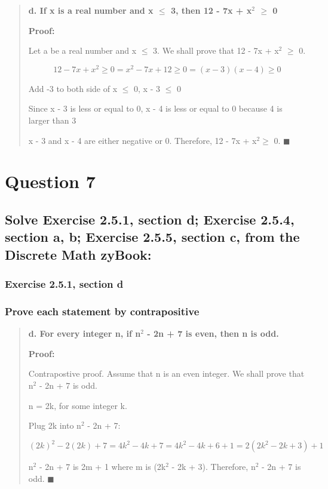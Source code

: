 \documentclass[11pt, oneside]{article}
\begin{document}
\begin{quote}
    \textbf{d. If x is a real number and x $\leq$ 3, then 12 - 7x + x$^2$ $\geq$ 0}
    
    \textbf{Proof:}
    
    Let a be a real number and x $\leq$ 3. We shall prove that 12 - 7x + x$^2$ $\geq$ 0.
    
    \[12 - 7x + x^2 \geq 0 = x^2 - 7x + 12 \geq 0 = (x - 3)(x - 4) \geq 0\]
    
    Add -3 to both side of x $\leq$ 0, x - 3 $\leq$ 0
    
    Since x - 3 is less or equal to 0, x - 4 is less or equal to 0 because 4 is larger than 3
    
    x - 3 and x - 4 are either negative or 0. Therefore, 12 - 7x + x$^2 \geq$ 0. $\blacksquare$
\end{quote}

\pagebreak

\section*{Question 7}

\subsection*{Solve Exercise 2.5.1, section d; Exercise 2.5.4, section a, b; Exercise 2.5.5, section c, from the Discrete Math zyBook:}

\subsubsection*{Exercise 2.5.1, section d}

\subsubsection*{Prove each statement by contrapositive}

\begin{quote}
    \textbf{d. For every integer n, if n$^2$ - 2n + 7 is even, then n is odd.}
    
    \textbf{Proof:}
    
    Contrapostive proof. Assume that n is an even integer. We shall prove that n$^2$ - 2n + 7 is odd.
    
    n = 2k, for some integer k.
    
    Plug 2k into n$^2$ - 2n + 7:
    
    \[(2k)^2 - 2(2k) + 7 = 4k^2 - 4k + 7 = 4k^2 - 4k + 6 + 1 = 2(2k^2 - 2k + 3) + 1\]
    
    n$^2$ - 2n + 7 is 2m + 1 where m is (2k$^2$ - 2k + 3). Therefore, n$^2$ - 2n + 7 is odd. $\blacksquare$
\end{quote}
\end{document}
